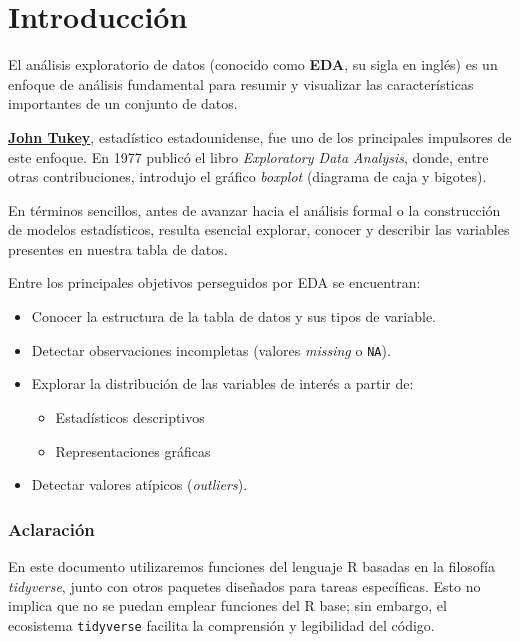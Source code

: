 \documentclass[
  spanish,
  a4paper,
]{scrbook}
\providecommand{\tightlist}{%
  \setlength{\itemsep}{0pt}\setlength{\parskip}{0pt}}
\begin{document}
\section{Introducción}\label{introducciuxf3n-3}

El análisis exploratorio de datos (conocido como \textbf{EDA}, su sigla
en inglés) es un enfoque de análisis fundamental para resumir y
visualizar las características importantes de un conjunto de datos.

\href{https://es.wikipedia.org/wiki/John_W._Tukey}{\textbf{John Tukey}},
estadístico estadounidense, fue uno de los principales impulsores de
este enfoque. En 1977 publicó el libro \emph{Exploratory Data Analysis},
donde, entre otras contribuciones, introdujo el gráfico \emph{boxplot}
(diagrama de caja y bigotes).

En términos sencillos, antes de avanzar hacia el análisis formal o la
construcción de modelos estadísticos, resulta esencial explorar, conocer
y describir las variables presentes en nuestra tabla de datos.

Entre los principales objetivos perseguidos por EDA se encuentran:

\begin{itemize}
\tightlist
\item
  Conocer la estructura de la tabla de datos y sus tipos de variable.
\item
  Detectar observaciones incompletas (valores \emph{missing} o
  \texttt{NA}).
\item
  Explorar la distribución de las variables de interés a partir de:

  \begin{itemize}
  \tightlist
  \item
    Estadísticos descriptivos
  \item
    Representaciones gráficas
  \end{itemize}
\item
  Detectar valores atípicos (\emph{outliers}).
\end{itemize}

\subsubsection{Aclaración}\label{aclaraciuxf3n}

En este documento utilizaremos funciones del lenguaje R basadas en la
filosofía \emph{tidyverse}, junto con otros paquetes diseñados para
tareas específicas. Esto no implica que no se puedan emplear funciones
del R base; sin embargo, el ecosistema \texttt{tidyverse} facilita la
comprensión y legibilidad del código.
\end{document}
